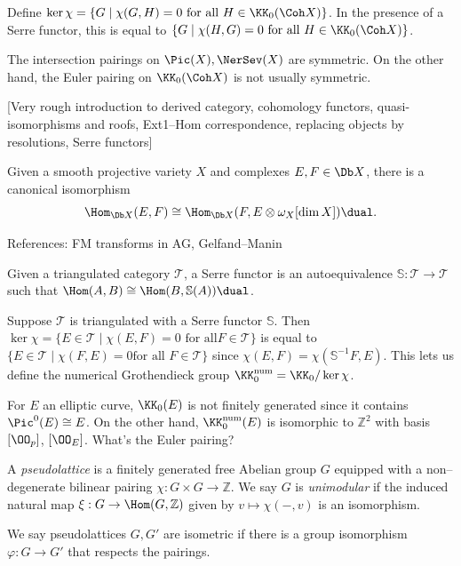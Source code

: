 Define \(\ker\chi = \{G\;|\; \chi(G,H)=0\text{ for all }H\in\KK_0(\Coh X)\}\).
In the presence of a Serre functor, this is equal to  \(\{G\;|\;
\chi(H,G)=0\text{ for all }H\in\KK_0(\Coh X)\}\).

The intersection pairings on \(\Pic(X), \NerSev(X)\) are symmetric. On the other
hand, the Euler pairing on \(\KK_0(\Coh X)\) is not usually symmetric.

[Very rough introduction to derived category, cohomology functors,
quasi-isomorphisms and roofs, Ext1--Hom correspondence, replacing objects by
resolutions, Serre functors]

\begin{theorem}
    Given a smooth projective variety \(X\) and complexes \(E,F\in \Db X\),
    there is a canonical isomorphism
    \[
        \Hom_{\Db X}(E,F) \cong \Hom_{\Db X}(F, E\otimes \omega_X[\dim X])\dual.
    \]
\end{theorem}

References: FM transforms in AG, Gelfand--Manin

\begin{theorem}
    Given a triangulated category \(\mathscr{T}\), a Serre functor is an
    autoequivalence \(\mathbb{S}:\mathscr{T}\to \mathscr{T}\) such that
    \(\Hom(A,B)\cong \Hom(B,\mathbb{S}(A))\dual\).
\end{theorem}

Suppose \(\mathscr{T}\) is triangulated with a Serre functor \(\mathbb{S}\).
Then \(\ker \chi = \{E\in \mathscr{T}\;|\; \chi(E,F)=0 \text{ for all
}F\in\mathscr{T}\}\) is equal to \(\{E\in\mathscr{T}\;|\; \chi(F,E)=0 \text{
for all }F\in\mathscr{T}\}\) since \(\chi(E,F)=\chi(\mathbb{S}^{-1}F, E)\). This
lets us define the numerical Grothendieck group \(\KK_0^\text{num}=\KK_0/\ker
\chi\).

\begin{example}
    For \(E\) an elliptic curve, \(\KK_0(E)\) is not finitely generated since it
    contains \(\Pic^0(E)\cong E\). On the other hand, \(\KK_0^\text{num}(E)\) is
    isomorphic to \(\mathbb{Z}^2\) with basis \([\OO_p]\), \([\OO_E]\). What's the
    Euler pairing?
\end{example}

\begin{definition}
    A \emph{pseudolattice} is a finitely generated free Abelian group \(G\)
    equipped with a non--degenerate bilinear pairing \(\chi:G\times G\to
    \mathbb{Z}\). We say \(G\) is \emph{unimodular} if the induced natural map
    \(\xi:G\to \Hom(G,\mathbb{Z})\) given by \(v\mapsto \chi(-,v)\)  is an
    isomorphism.

    We say pseudolattices \(G,G'\) are isometric if there is a group isomorphism
    \(\varphi:G\to G'\) that respects the pairings.
\end{definition}

